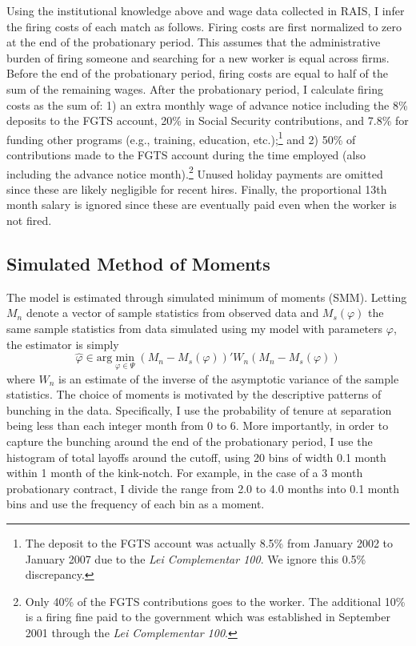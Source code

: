 \documentclass[12pt]{article}
\begin{document}
Using the institutional knowledge above and wage data collected in RAIS, I infer the firing costs of each match as follows.
Firing costs are first normalized to zero at the end of the probationary period.
This assumes that the administrative burden of firing someone and searching for a new worker is equal across firms.
Before the end of the probationary period, firing costs are equal to half of the sum of the remaining wages. 
After the probationary period, I calculate firing costs as the sum of:
1) an extra monthly wage of advance notice including the 8\% deposits to the FGTS account, 20\% in Social Security contributions, and 7.8\% for funding other programs (e.g., training, education, etc.);\footnote{
The deposit to the FGTS account was actually 8.5\% from January 2002 to January 2007 due to the \textit{Lei Complementar 100}.
We ignore this 0.5\% discrepancy.} and
2) 50\% of contributions made to the FGTS account during the time employed (also including the advance notice month).\footnote{
Only 40\% of the FGTS contributions goes to the worker. 
The additional 10\% is a firing fine paid to the government which was established in September 2001 through the \textit{Lei Complementar 100}.}
Unused holiday payments are omitted since these are likely negligible for recent hires.
Finally, the proportional 13th month salary is ignored since these are eventually paid even when the worker is not fired. 


\subsection{Simulated Method of Moments} \label{smm}

The model is estimated through simulated minimum of moments (SMM).
Letting $M_n$ denote a vector of sample statistics from observed data and $M_s(\varphi)$ the same sample statistics from data simulated using my model with parameters $\varphi$, the estimator is simply
\begin{equation} \nonumber
 \hat{\varphi}\in\text{arg}\min_{\varphi\in\Psi}(M_n-M_s(\varphi))'W_n(M_n-M_s(\varphi))
\end{equation}
where $W_n$ is an estimate of the inverse of the asymptotic variance of the sample statistics.
The choice of moments is motivated by the descriptive patterns of bunching in the data.
Specifically, I use the probability of tenure at separation being less than each integer month from 0 to 6.
More importantly, in order to capture the bunching around the end of the probationary period, I use the histogram of total layoffs around the cutoff, using 20 bins of width 0.1 month within 1 month of the kink-notch.
For example, in the case of a 3 month probationary contract, I divide the range from 2.0 to 4.0 months into 0.1 month bins and use the frequency of each bin as a moment.
\end{document}
